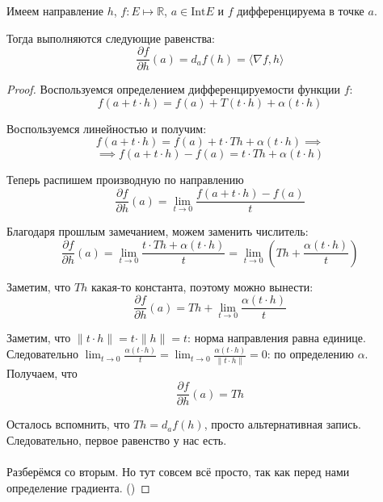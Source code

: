 \begin{theorem} \thmslashn
	
	Имеем направление $ h $, $ f : E \mapsto \mathbb{R} $, $ a \in \mathrm{Int} E $ и $ f $ дифференцируема в точке $ a $.
	
	Тогда выполняются следующие равенства:
	\[
	\frac{\partial f}{\partial h} (a) = d_a f (h) = \langle \nabla f, h \rangle
	\]
	
	\begin{proof} \thmslashn
			
		Воспользуемся определением дифференцируемости функции $ f $: 
		\[
		f(a + t \cdot h) = f(a) + T(t \cdot h) + \alpha(t \cdot h)
		\]
		
		Воспользуемся линейностью и получим:
		\[
		f(a + t \cdot h) = f(a) + t \cdot Th + \alpha(t \cdot h) \implies
		\]
		\[
		\implies f(a + t \cdot h) - f(a) = t \cdot Th + \alpha(t \cdot h)
		\]
		
		Теперь распишем производную по направлению
		\[
		\frac{\partial f}{\partial h} (a) = \lim_{t \to 0} \frac{f(a + t \cdot h) - f(a)}{t}
		\]
		
		Благодаря прошлым замечанием, можем заменить числитель:
		\[
		\frac{\partial f}{\partial h} (a) = \lim_{t \to 0} \frac{t \cdot Th + \alpha(t \cdot h)}{t} = \lim_{t \to 0} (Th + \frac{\alpha(t \cdot h)}{t})
		\]
		
		Заметим, что $ Th $ какая-то константа, поэтому можно вынести:
		\[
		\frac{\partial f}{\partial h} (a) = Th + \lim_{t \to 0} \frac{\alpha(t \cdot h)}{t}
		\]
		
		Заметим, что $ \| t \cdot h \| = t \cdot \| h \| = t $: норма направления равна единице.
		Следовательно $ \lim_{t \to 0} \frac{\alpha(t \cdot h)}{t} = \lim_{t \to 0} \frac{\alpha(t \cdot h)}{\| t \cdot h \|} = 0 $: по определению $ \alpha $.  \\
		Получаем, что
		\[
		\frac{\partial f}{\partial h} (a) = Th
		\]
		
		Осталось вспомнить, что $ Th = d_a f (h) $, просто альтернативная запись. Следовательно, первое равенство у нас есть. \\ \\
		Разберёмся со вторым. Но тут совсем всё просто, так как перед нами определение градиента. ()
		
	\end{proof}
	
\end{theorem}

